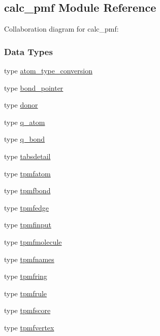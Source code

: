 \hypertarget{classcalc__pmf}{\subsection{calc\-\_\-pmf Module Reference}
\label{classcalc__pmf}
}


Collaboration diagram for calc\-\_\-pmf\-:
\subsubsection*{Data Types}
\begin{DoxyCompactItemize}
\item 
type \hyperlink{structcalc__pmf_1_1atom__type__conversion}{atom\-\_\-type\-\_\-conversion}
\item 
type \hyperlink{structcalc__pmf_1_1bond__pointer}{bond\-\_\-pointer}
\item 
type \hyperlink{structcalc__pmf_1_1donor}{donor}
\item 
type \hyperlink{structcalc__pmf_1_1q__atom}{q\-\_\-atom}
\item 
type \hyperlink{structcalc__pmf_1_1q__bond}{q\-\_\-bond}
\item 
type \hyperlink{structcalc__pmf_1_1tabsdetail}{tabsdetail}
\item 
type \hyperlink{structcalc__pmf_1_1tpmfatom}{tpmfatom}
\item 
type \hyperlink{structcalc__pmf_1_1tpmfbond}{tpmfbond}
\item 
type \hyperlink{structcalc__pmf_1_1tpmfedge}{tpmfedge}
\item 
type \hyperlink{structcalc__pmf_1_1tpmfinput}{tpmfinput}
\item 
type \hyperlink{structcalc__pmf_1_1tpmfmolecule}{tpmfmolecule}
\item 
type \hyperlink{structcalc__pmf_1_1tpmfnames}{tpmfnames}
\item 
type \hyperlink{structcalc__pmf_1_1tpmfring}{tpmfring}
\item 
type \hyperlink{structcalc__pmf_1_1tpmfrule}{tpmfrule}
\item 
type \hyperlink{structcalc__pmf_1_1tpmfscore}{tpmfscore}
\item 
type \hyperlink{structcalc__pmf_1_1tpmfvertex}{tpmfvertex}
\end{DoxyCompactItemize}
